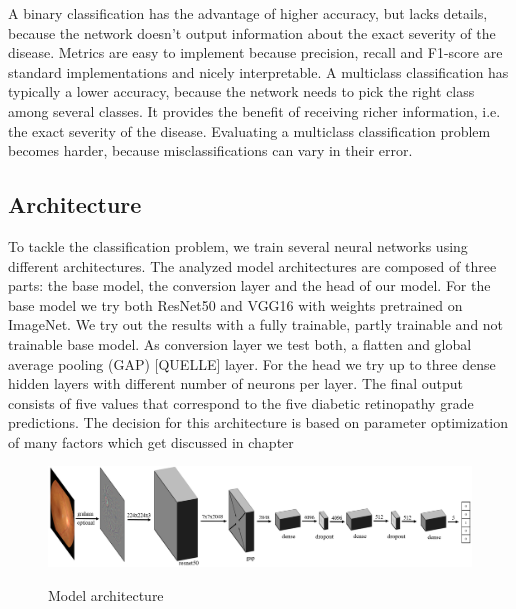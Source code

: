 \documentclass{article}
\begin{document}
A binary classification has the advantage of higher accuracy, but lacks details, because the network doesn't output 
information about the exact severity of the disease. Metrics are easy to implement because precision, 
recall and F1-score are standard implementations and nicely interpretable. A multiclass classification has typically a 
lower accuracy, because the network needs to pick the right class among 
several classes. It provides the benefit of receiving richer information, i.e. the exact severity of the disease.
Evaluating a multiclass classification problem becomes harder, because misclassifications can vary in their error.

\subsection{Architecture}
To tackle the classification problem, we train several neural networks using different architectures.
The analyzed model architectures are composed of three parts: the 
base model, the conversion layer and the head of our model. For the base model we try both ResNet50 and VGG16 with 
weights pretrained on ImageNet. We try out the results with a fully trainable, partly trainable and not trainable
base model. As conversion layer we test both, a flatten and global average pooling (GAP) [QUELLE] layer.
For the head we try up to three dense hidden layers with different number of neurons per layer.
The final output consists of five values that correspond to the five diabetic retinopathy grade predictions.
The decision for this architecture is based on parameter optimization of many factors which get discussed in chapter%
\begin{figure}[h]
  \centering
  \includegraphics[width=1\textwidth]{2_2_architecture.png}\label{fig:architecture}
  \caption{Model architecture}
\end{figure}
\end{document}
